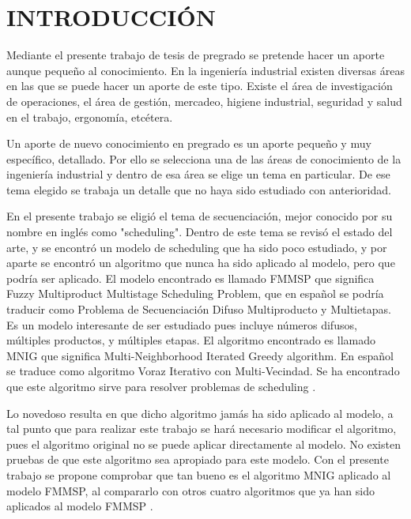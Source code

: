 \documentclass{article}
\begin{document}
\section{INTRODUCCIÓN}

Mediante el presente trabajo de tesis de pregrado se pretende hacer un aporte
aunque pequeño al conocimiento. En la ingeniería industrial existen diversas
áreas en las que se puede hacer un aporte de este tipo. Existe el área de
investigación de operaciones, el área de gestión, mercadeo, higiene industrial,
seguridad y salud en el trabajo, ergonomía, etcétera. 

\vspace{\baselineskip}
Un aporte de nuevo conocimiento en pregrado es un aporte pequeño y muy
específico, detallado. Por ello se selecciona una de las áreas de conocimiento
de la ingeniería industrial y dentro de esa área se elige un tema en particular.
De ese tema elegido se trabaja un detalle que no haya sido estudiado con
anterioridad. 

\vspace{\baselineskip}
En el presente trabajo se eligió el tema de secuenciación, mejor conocido por
su nombre en inglés como "scheduling". Dentro de este tema se revisó el estado
del arte, y se encontró un modelo de scheduling que ha sido poco estudiado, y
por aparte se encontró un algoritmo que nunca ha sido aplicado al modelo, pero
que podría ser aplicado. El modelo encontrado \autocite{modFMMSP} es llamado 
FMMSP que significa Fuzzy Multiproduct Multistage Scheduling Problem, que en 
español se podría traducir como Problema de Secuenciación Difuso Multiproducto 
y Multietapas. Es un modelo interesante de ser estudiado pues incluye números 
difusos, múltiples productos, y múltiples etapas. El algoritmo encontrado 
\autocite{algMNIG} es llamado MNIG que significa Multi-Neighborhood Iterated
Greedy algorithm. En español se traduce como algoritmo Voraz Iterativo con 
Multi-Vecindad. Se ha encontrado que este algoritmo sirve para resolver 
problemas de scheduling \autocite{algMNIG}. 

\vspace{\baselineskip}
Lo novedoso resulta en que dicho algoritmo jamás ha sido aplicado al modelo, a 
tal punto que para realizar este trabajo se hará necesario modificar el 
algoritmo, pues el algoritmo original no se puede aplicar directamente al 
modelo. No existen pruebas de que este algoritmo sea apropiado para este modelo.
Con el presente trabajo se propone comprobar que tan bueno es el algoritmo MNIG
aplicado al modelo FMMSP, al compararlo con otros cuatro algoritmos que ya han
sido aplicados al modelo FMMSP \autocite{modFMMSP}.
\end{document}
